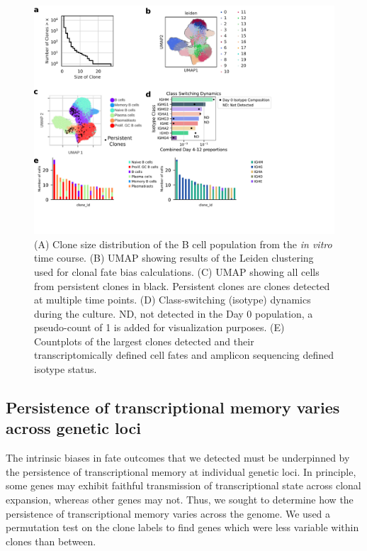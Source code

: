 \begin{figure}[hbt!]
\centering
\includegraphics[width=12cm, keepaspectratio]{figs/InVitro/figS3_bcd.pdf}
\caption[Clonal analysis of cell identity outcomes.]{(A) Clone size distribution of the B cell population from the \textit{in vitro} time course. (B) UMAP showing results of the Leiden clustering used for clonal fate bias calculations. (C) UMAP showing all cells from persistent clones in black. Persistent clones are clones detected at multiple time points. (D) Class-switching (isotype) dynamics during the culture. ND, not detected in the Day 0 population, a pseudo-count of 1 is added for visualization purposes. (E) Countplots of the largest clones detected and their transcriptomically defined cell fates and amplicon sequencing defined isotype status.}
\label{fig:paper2_fig_s3}
\end{figure}


\subsection{Persistence of transcriptional memory varies across genetic loci}
The intrinsic biases in fate outcomes that we detected must be underpinned by the persistence of transcriptional memory at individual genetic loci. In principle, some genes may exhibit faithful transmission of transcriptional state across clonal expansion, whereas other genes may not. Thus, we sought to determine how the persistence of transcriptional memory varies across the genome. We used a permutation test on the clone labels to find genes which were less variable within clones than between.

